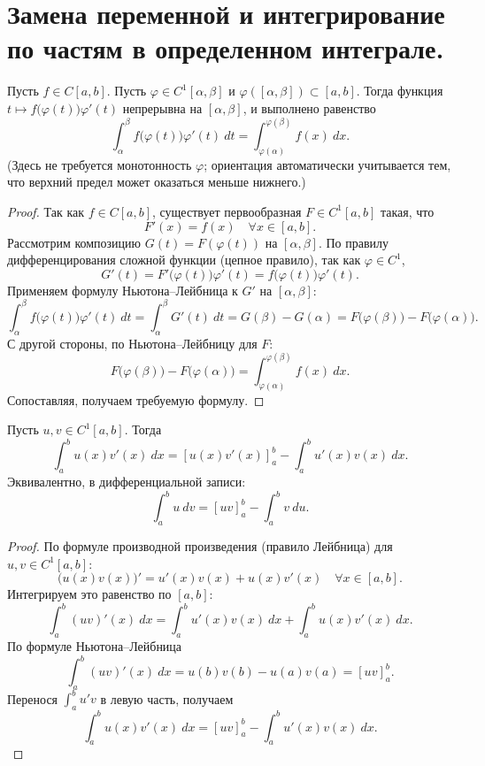 \documentclass[14pt]{extreport}
\begin{document}
    \chapter{Замена переменной и интегрирование по частям в определенном интеграле.}

    \begin{theorem}
        Пусть $f \in C[a,b]$. Пусть $\varphi \in C^1[\alpha,\beta]$ и $\varphi([\alpha,\beta]) \subset [a,b]$. Тогда функция $t \mapsto f \bigl( \varphi(t) \bigr)\varphi'(t)$ непрерывна на $[\alpha,\beta]$, и выполнено равенство
        \[
        \int_\alpha^\beta f \bigl( \varphi(t) \bigr) \varphi'(t)\ dt = \int_{\varphi(\alpha)}^{\varphi(\beta)} f(x)\ dx.
        \]
        (Здесь не требуется монотонность $\varphi$; ориентация автоматически учитывается тем, что верхний предел может оказаться меньше нижнего.)
    \end{theorem}

    \begin{proof}
        Так как $f \in C[a,b]$, существует первообразная $F \in C^1[a,b]$ такая, что
        \[
        F'(x) = f(x) \quad \forall x \in [a,b].
        \]
        Рассмотрим композицию $G(t) = F(\varphi(t))$ на $[\alpha,\beta]$. По правилу дифференцирования сложной функции (цепное правило), так как $\varphi \in C^1$,
        \[
        G'(t) = F' \bigl( \varphi(t) \bigr)\varphi'(t) = f \bigl( \varphi(t) \bigr)\varphi'(t).
        \]
        Применяем формулу Ньютона–Лейбница к $G'$ на $[\alpha,\beta]$:
        \[
        \int_\alpha^\beta f \bigl( \varphi(t) \bigr) \varphi'(t)\ dt = \int_\alpha^\beta G'(t)\ dt = G(\beta) - G(\alpha) = F \bigl( \varphi(\beta) \bigr) - F \bigl( \varphi(\alpha) \bigr).
        \]
        С другой стороны, по Ньютона–Лейбницу для $F$:
        \[
        F \bigl( \varphi(\beta) \bigr) - F \bigl( \varphi(\alpha) \bigr) = \int_{\varphi(\alpha)}^{\varphi(\beta)} f(x)\ dx.
        \]
        Сопоставляя, получаем требуемую формулу.
    \end{proof}

    \begin{theorem}
        Пусть $u,v \in C^1[a,b]$. Тогда
        \[
        \int_a^b u(x) v'(x)\ dx = [u(x) v'(x)]_a^b - \int_a^b u'(x) v(x)\ dx.
        \]
        Эквивалентно, в дифференциальной записи:
        \[
        \int_a^b u\ dv = [uv]_a^b - \int_a^b v\ du.
        \]
    \end{theorem}

    \begin{proof}
        По формуле производной произведения (правило Лейбница) для $u,v \in C^1[a,b]$:
        \[
        \bigl( u(x)v(x) \bigr)' = u'(x)v(x) + u(x)v'(x) \quad \forall x \in [a,b].
        \]
        Интегрируем это равенство по $[a,b]$:
        \[
        \int_a^b (uv)'(x)\ dx = \int_a^b u'(x)v(x)\ dx + \int_a^b u(x)v'(x)\ dx.
        \]
        По формуле Ньютона–Лейбница
        \[
        \int_a^b (uv)'(x)\ dx = u(b)v(b) - u(a)v(a) = [uv]_a^b.
        \]
        Перенося $\int_a^b u'v$ в левую часть, получаем
        \[
        \int_a^b u(x)v'(x)\ dx = [uv]_a^b - \int_a^b u'(x)v(x)\ dx.
        \]
    \end{proof}
\end{document}
